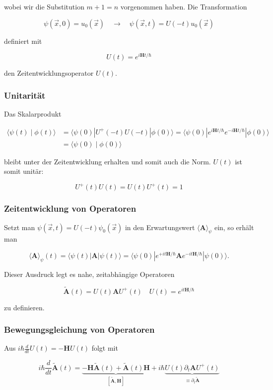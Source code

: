 \documentclass[10pt, letterpaper]{article}
\begin{document}
wobei wir die Substitution $m+1=n$ vorgenommen haben. Die Transformation

$$
\psi(\vec{x}, 0)=u_{0}(\vec{x}) \quad \rightarrow \quad \psi(\vec{x}, t)=U(-t) u_{0}(\vec{x})
$$

definiert mit

$$
U(t)=e^{i \mathbf{H} t / \hbar}
$$

den Zeitentwicklungsoperator $U(t)$.

\subsubsection*{Unitarität}
Das Skalarprodukt

$$
\begin{aligned}
\langle\psi(t) \mid \phi(t)\rangle & =\langle\psi(0)| U^{+}(-t) U(-t)|\phi(0)\rangle=\langle\psi(0)| e^{i \mathbf{H} t / \hbar} e^{-i \mathbf{H} t / \hbar}|\phi(0)\rangle \\
& =\langle\psi(0) \mid \phi(0)\rangle
\end{aligned}
$$

bleibt unter der Zeitentwicklung erhalten und somit auch die Norm. $U(t)$ ist somit unitär:

$$
U^{+}(t) U(t)=U(t) U^{+}(t)=1
$$

\subsubsection*{Zeitentwicklung von Operatoren}
Setzt man $\psi(\vec{x}, t)=U(-t) \psi_{0}(\vec{x})$ in den Erwartungswert $\langle\mathbf{A}\rangle_{\psi}$ ein, so erhält man

$$
\langle\mathbf{A}\rangle_{\psi}(t)=\langle\psi(t)| \mathbf{A}|\psi(t)\rangle=\langle\psi(0)| e^{+i t \mathbf{H} / \hbar} \mathbf{A} e^{-i t \mathbf{H} / \hbar}|\psi(0)\rangle .
$$

Dieser Ausdruck legt es nahe, zeitabhängige Operatoren

$$
\tilde{\mathbf{A}}(t)=U(t) \mathbf{A} U^{+}(t) \quad U(t)=e^{i t \mathbf{H} / \hbar}
$$

zu definieren.

\subsubsection*{Bewegungsgleichung von Operatoren}
Aus $i \hbar \frac{d}{d t} U(t)=-\mathbf{H} U(t)$ folgt mit

$$
i \hbar \frac{d}{d t} \tilde{\mathbf{A}}(t)=\underbrace{-\mathbf{H} \tilde{\mathbf{A}}(t)+\tilde{\mathbf{A}}(t) \mathbf{H}}_{[\tilde{\mathbf{A}}, \mathbf{H}]}+i \hbar \underbrace{U(t) \partial_{t} \mathbf{A} U^{+}(t)}_{\equiv \partial_{t} \tilde{\mathbf{A}}}
$$
\end{document}
